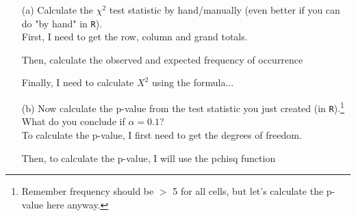 \documentclass[12pt,letterpaper]{article}
\begin{document}
\begin{enumerate}
	
	\item [(a)]
	Calculate the $\chi^2$ test statistic by hand/manually (even better if you can do "by hand" in \texttt{R}).\\
	
	First, I need to get the row, column and grand totals.
	
	\vspace{0.5cm}
	  
	\vspace{0.5cm}
	
	Then, calculate the observed and expected frequency of occurrence
	
	\vspace{0.5cm}
	  
	\vspace{0.5cm} 
	
	Finally, I need to calculate $X^2$ using the formula...
	
	\vspace{0.5cm}
	  
	\vspace{0.5cm}
	
	\vspace{1cm}
	
	\item [(b)]
	Now calculate the p-value from the test statistic you just created (in \texttt{R}).\footnote{Remember frequency should be $>$ 5 for all cells, but let's calculate the p-value here anyway.}  What do you conclude if $\alpha = 0.1$?\\
	
	To calculate the p-value, I first need to get the degrees of freedom.
	
	  
	
	\vspace{1cm}
	
	Then, to calculate the p-value, I will use the pchisq function
	
	  
	

\end{enumerate}
\end{document}
